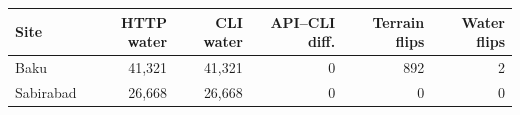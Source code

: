 \begin{tabular}{@{}lrrrrr@{}}
\toprule
Site & HTTP water & CLI water & API--CLI diff. & Terrain flips & Water flips \\
\midrule
Baku & 41,321 & 41,321 & 0 & 892 & 2 \\
Sabirabad & 26,668 & 26,668 & 0 & 0 & 0 \\
\bottomrule
\end{tabular}
